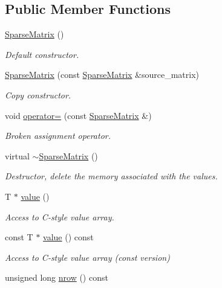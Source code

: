 \subsection*{Public Member Functions}
\begin{DoxyCompactItemize}
\item 
\hyperlink{classoomph_1_1SparseMatrix_a9aff0ae09aadbc704580726a53fe51c5}{Sparse\+Matrix} ()
\begin{DoxyCompactList}\small\item\em Default constructor. \end{DoxyCompactList}\item 
\hyperlink{classoomph_1_1SparseMatrix_a9e4062d0e4f877537d195aada71d854d}{Sparse\+Matrix} (const \hyperlink{classoomph_1_1SparseMatrix}{Sparse\+Matrix} \&source\+\_\+matrix)
\begin{DoxyCompactList}\small\item\em Copy constructor. \end{DoxyCompactList}\item 
void \hyperlink{classoomph_1_1SparseMatrix_a51c2fc4a13ad870653414fee8daad23d}{operator=} (const \hyperlink{classoomph_1_1SparseMatrix}{Sparse\+Matrix} \&)
\begin{DoxyCompactList}\small\item\em Broken assignment operator. \end{DoxyCompactList}\item 
virtual \hyperlink{classoomph_1_1SparseMatrix_aa938bb1200e49f080b980fe7248f589e}{$\sim$\+Sparse\+Matrix} ()
\begin{DoxyCompactList}\small\item\em Destructor, delete the memory associated with the values. \end{DoxyCompactList}\item 
T $\ast$ \hyperlink{classoomph_1_1SparseMatrix_a3e382ff145082821a6b0b3e63b6aed5d}{value} ()
\begin{DoxyCompactList}\small\item\em Access to C-\/style value array. \end{DoxyCompactList}\item 
const T $\ast$ \hyperlink{classoomph_1_1SparseMatrix_a4d78622bb3cbfe1f39bb175355fb23fb}{value} () const
\begin{DoxyCompactList}\small\item\em Access to C-\/style value array (const version) \end{DoxyCompactList}\item 
unsigned long \hyperlink{classoomph_1_1SparseMatrix_a21e22f93a942583ca83cea18c23bdd11}{nrow} () const

\end{DoxyCompactItemize}
